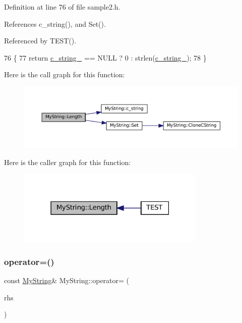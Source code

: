 Definition at line 76 of file sample2.\+h.



References c\+\_\+string(), and Set().



Referenced by T\+E\+S\+T().


\begin{DoxyCode}
76                         \{
77     \textcolor{keywordflow}{return} \hyperlink{classMyString_a1872c0d04ff5f6e654161472b18bb9d0}{c\_string\_} == NULL ? 0 : strlen(\hyperlink{classMyString_a1872c0d04ff5f6e654161472b18bb9d0}{c\_string\_});
78   \}
\end{DoxyCode}
Here is the call graph for this function\+:
\nopagebreak
\begin{figure}[H]
\begin{center}
\leavevmode
\includegraphics[width=350pt]{classMyString_a4eb168b1ec401a732b3859abe004d648_cgraph}
\end{center}
\end{figure}
Here is the caller graph for this function\+:
\nopagebreak
\begin{figure}[H]
\begin{center}
\leavevmode
\includegraphics[width=255pt]{classMyString_a4eb168b1ec401a732b3859abe004d648_icgraph}
\end{center}
\end{figure}
\mbox{\label{classMyString_a0156d24764b9d8e4303763750f95cd38}} 
\subsubsection{\texorpdfstring{operator=()}{operator=()}}
{\footnotesize\ttfamily const \hyperlink{classMyString}{My\+String}\& My\+String\+::operator= (\begin{DoxyParamCaption}\item[{const \hyperlink{classMyString}{My\+String} \&}]{rhs }\end{DoxyParamCaption})\hspace{0.3cm}{\ttfamily [private]}}

